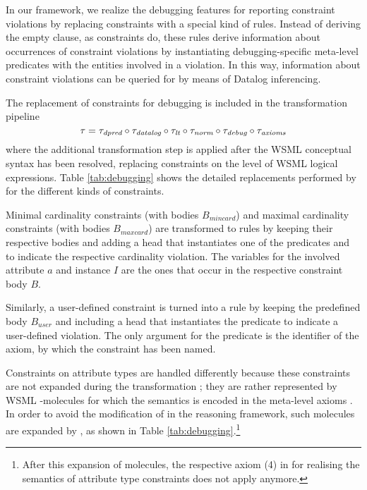 In our framework, we realize the debugging features for reporting
constraint violations by replacing constraints with a special kind
of rules. Instead of deriving the empty clause, as constraints do,
these rules derive information about occurrences of constraint
violations by instantiating debugging-specific meta-level
predicates with the entities involved in a violation. In this way,
information about constraint violations can be queried for by
means of Datalog inferencing.

The replacement of constraints for debugging is included in the
transformation pipeline
\begin{displaymath}
    \tau = \tau_{\textit{\scriptsize{dpred}}} \circ \tau_{\textit{\scriptsize{datalog}}} \circ \tau_{\textit{\scriptsize{lt}}} \circ \tau_{\textit{\scriptsize{norm}}} \circ \tau_{\textit{\scriptsize{debug}}} \circ \tau_{\textit{\scriptsize{axioms}}}
\end{displaymath}
where the additional transformation step \transdebug is applied
after the WSML conceptual syntax has been resolved, replacing
constraints on the level of WSML logical expressions. Table
\ref{tab:debugging} shows the detailed replacements performed by
\transdebug for the different kinds of constraints.

Minimal cardinality constraints (with bodies $B_{mincard}$) and
maximal cardinality constraints (with bodies $B_{maxcard}$) are
transformed to rules by keeping their respective bodies and adding
a head that instantiates one of the predicates \pvmincard and
\pvmaxcard to indicate the respective cardinality violation. The
variables for the involved attribute $a$ and instance $I$ are the
ones that occur in the respective constraint body $B$.

Similarly, a user-defined constraint is turned into a rule by
keeping the predefined body $B_{user}$ and including a head that
instantiates the predicate \pvuser to indicate a user-defined
violation. The only argument for the predicate \pvuser is the
identifier \axiomid of the axiom, by which the constraint has been
named.

Constraints on attribute types are handled differently because
these constraints are not expanded during the transformation
\transax ; they are rather represented by WSML
-molecules for which the semantics is encoded in the
meta-level axioms \mlaxioms. In order to avoid the modification of
\mlaxioms in the reasoning framework, such molecules are expanded
by \transdebug, as shown in Table
\ref{tab:debugging}.\footnote{After this expansion of
 molecules, the respective axiom (4) in \mlaxioms for
realising the semantics of attribute type constraints does not
apply anymore.}

